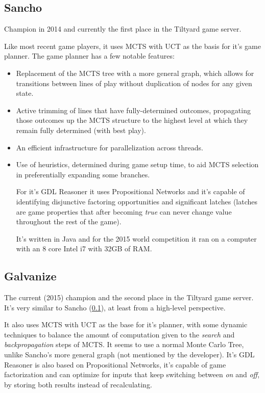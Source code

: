 \subsection{Sancho}
\label{ssc:Sancho}
Champion in 2014 and currently the first place in the Tiltyard game server.

Like most recent game players, it uses \gls{MCTS} with \gls{UCT} as the  basis for it's game planner. The game planner has a few notable features: 

\begin{itemize}

\item Replacement of the MCTS tree with a more general graph, which allows for transitions between lines of play without duplication of nodes for any given state.

\item Active trimming of lines that have fully-determined outcomes, propagating those outcomes up the MCTS structure to the highest level at which they remain fully determined (with best play).

\item An efficient infrastructure for parallelization across threads.

\item Use of heuristics, determined during game setup time, to aid MCTS selection in preferentially expanding some branches.

For it's \gls{GDL} Reasoner it uses Propositional Networks and it's capable of identifying disjunctive factoring opportunities and significant latches (latches are game properties that after becoming \textit{true} can never change value throughout the rest of the game).

It's written in Java and for the 2015 world competition it ran on a computer with an 8 core Intel i7 with 32GB of RAM.

\end{itemize}


\subsection{Galvanize}
The current (2015) champion and the second place in the Tiltyard game server.
It's very similar to Sancho (\ref{ssc:Sancho}), at least from a high-level perspective. 

It also uses \gls{MCTS} with \gls{UCT} as the base for it's planner, with some dynamic techniques to balance the amount of computation given to the \textit{search} and \textit{backpropagation} steps of \gls{MCTS}. It seems to use a normal Monte Carlo Tree, unlike Sancho's more general graph (not mentioned by the developer). 
It's GDL Reasoner is also based on Propositional Networks, it's capable of game factorization and can optimize for inputs that keep switching between \textit{on} and \textit{off}, by storing both results instead of recalculating.

